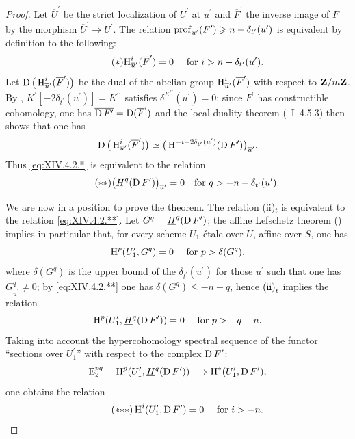 \begin{proof}
Let $\overline{U}^{\prime}$ be the strict localization of $U^{\prime}$ at $\overline{u}^{\prime}$ and $\overline{F}^{\prime}$ the inverse image of $F$ by the morphism $\overline{U}^{\prime}\to U^{\prime}$. The relation $\operatorname{prof}_{u^{\prime}}(F^{\prime})\geqslant n-\delta_{t^{\prime}}(u^{\prime})$ is equivalent by definition to the following:
\begin{equation*} \label{eq:XIV.4.2.*} \tag{$*$} {\operatorname{H}_{\overline{u}^{\prime}}^{i}(\overline{F}^{\prime})=0\quad\textrm{ for }i>n-\delta_{t^{\prime}}(u^{\prime}).}
\end{equation*}
Let $\operatorname{D}\big(\operatorname{H}_{\overline{u}^{\prime}}^{i}(\overline{F}^{\prime})\big)$ be the dual of the abelian group $\operatorname{H}_{\overline{u}^{\prime}}^{i}(\overline{F}^{\prime})$ with respect to $\mathbf{Z}/m\mathbf{Z}$. By , $K^{\prime}[-2\delta_{t^{\prime}}(u^{\prime})]=K^{\prime\prime}$ satisfies $\delta^{K^{\prime\prime}}(u^{\prime})=0$; since $F^{\prime}$ has constructible cohomology, one has $\overline{\operatorname{D} F^{\prime}}=\operatorname{D}(\overline{F}^{\prime})$ and the local duality theorem (~I~4.5.3) then shows that one has
$$
\operatorname{D}\big(\operatorname{H}_{\overline{u}^{\prime}}^{i}(\overline{F}^{\prime})\big) \simeq\big(\operatorname{H}^{-i-2\delta_{t^{\prime}}(u^{\prime})}(\operatorname{D} F^{\prime})\big)_{\overline{u}^{\prime}}.
$$
Thus \eqref{eq:XIV.4.2.*} is equivalent to the relation
\begin{equation*} \label{eq:XIV.4.2.**} \tag{$**$}
\big(\underline{H}^{q}(\operatorname{D} F^{\prime})\big)_{\overline{u}^{\prime}}=0\quad\text{for }q>-n-\delta_{t^{\prime}}(u^{\prime}).
\end{equation*}

We are now in a position to prove the theorem. The relation \textup{(ii)}$_{t}$ is equivalent to the relation \eqref{eq:XIV.4.2.**}. Let $G^{q}=\underline{H}^{q}(\operatorname{D} F^{\prime})$; the affine Lefschetz theorem () implies in particular that, for every scheme $U_{1}$ \'etale over $U$, affine over $S$, one has
$$
\operatorname{H}^{p}(U_{1}^{\prime}, G^{q})=0\quad\textrm{ for }p>\delta(G^{q}),
$$
where $\delta(G^{q})$ is the upper bound of the $\delta_{t^{\prime}}(u^{\prime})$ for those $u^{\prime}$ such that one has $G_{\overline{u}^{\prime}}^{q}\neq 0$; by \eqref{eq:XIV.4.2.**} one has $\delta(G^{q})\leq -n-q$, hence $\textup{(ii)}_{t}$ implies the relation
$$
\operatorname{H}^{p}(U_{1}^{\prime}, \underline{H}^{q}(\operatorname{D} F^{\prime}))=0\quad\textrm{ for }p>-q-n.
$$
Taking into account the hypercohomology spectral sequence of the functor ``sections over $U_{1}^{\prime}$'' with respect to the complex $\operatorname{D} F^{\prime}$:
$$
\E_{2}^{pq}=\H^{p}(U_{1}^{\prime}, \underline{H}^{q}(\D F^{\prime}))\To\H^{\ast}(U_{1}^{\prime}, \D F^{\prime}),
$$
one obtains the relation
\begin{equation*} \label{eq:XIV.4.2.***} \tag{${*}{*}{*}$}
\H^{i}(U_{1}^{\prime}, \D F^{\prime})=0\quad\textrm{ for }i>-n.
\end{equation*}


\end{proof}
